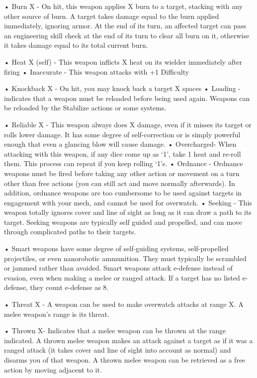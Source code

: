 •  Burn X - On hit, this weapon applies X burn to a target, stacking with any other source of burn.
  A target takes damage equal to the burn applied immediately, ignoring armor. At the end of its
  turn, an affected target can pass an engineering skill check at the end of its turn to clear all
  burn on it, otherwise it takes damage equal to its total current burn.





•  Heat X (self) - This weapon inflicts X heat on its wielder immediately after firing
•  Inaccurate - This weapon attacks with +1 Difficulty

•  Knockback X - On hit, you may knock back a target X spaces
•  Loading - indicates that a weapon must be reloaded before being used again. Weapons can
  be reloaded by the Stabilize actions or some systems.

•  Reliable X - This weapon always does X damage, even if it misses its target or rolls lower
  damage. It has some degree of self-correction or is simply powerful enough that even a
  glancing blow will cause damage.
•  Overcharged- When attacking with this weapon, if any dice come up as ‘1’, take 1 heat and
  re-roll them. This process can repeat if you keep rolling ‘1’s.
•  Ordnance - Ordnance weapons must be fired before taking any other action or movement on a
  turn other than free actions (you can still act and move normally afterwards). In addition,
  ordnance weapons are too cumbersome to be used against targets in engagement with your
  mech, and cannot be used for overwatch.
•  Seeking - This weapon totally ignores cover and line of sight as long as it can draw a path to
  its target. Seeking weapons are typically self guided and propelled, and can move through
  complicated paths to their targets.

•  Smart weapons have some degree of self-guiding systems, self-propelled projectiles, or even
  nanorobotic ammunition. They must typically be scrambled or jammed rather than avoided.
  Smart weapons attack e-defense instead of evasion, even when making a melee or ranged
  attack. If a target has no listed e-defense, they count e-defense as 8.

•  Threat X - A weapon can be used to make overwatch attacks at range X. A melee weapon’s
  range is its threat.

•  Thrown X- Indicates that a melee weapon can be thrown at the range indicated. A thrown
  melee weapon makes an attack against a target as if it was a ranged attack (it takes cover and
  line of sight into account as normal) and disarms you of that weapon. A thrown melee weapon
  can be retrieved as a free action by moving adjacent to it.


